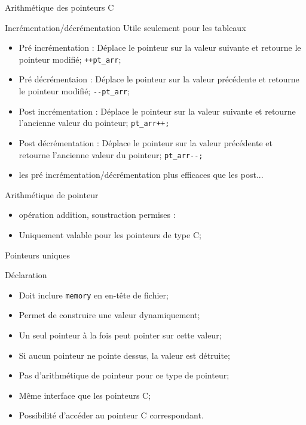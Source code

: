 \documentclass[handout,10pt]{beamer}
\newcommand{\includepartcode}[4][cpp]{

}
\begin{document}
\begin{frame}[fragile]{Arithmétique des pointeurs C}
\tiny
\begin{block}{Incrémentation/décrémentation}
Utile seulement pour les tableaux
\begin{itemize}
\item {\color{blue}Pré incrémentation} : Déplace le pointeur sur la valeur suivante et retourne le pointeur modifié; \lstinline$++pt_arr$;
\item {\color{blue}Pré décrémentaion} : Déplace le pointeur sur la valeur précédente et retourne le pointeur modifié; \lstinline$--pt_arr$;
\item {\color{blue}Post incrémentation} : Déplace le pointeur sur la valeur suivante et retourne l'ancienne valeur du pointeur; \lstinline$pt_arr++;$
\item {\color{blue}Post décrémentation} : Déplace le pointeur sur la valeur précédente et retourne l'ancienne valeur du pointeur; \lstinline$pt_arr--;$
\item les pré incrémentation/décrémentation plus efficaces que les post...
\end{itemize}
\end{block}

\begin{block}{Arithmétique de pointeur}
\begin{itemize}
\item opération addition, soustraction permises :
\includepartcode{pointeurs.cpp}{23}{25}
\item Uniquement valable pour les pointeurs de type C;
\end{itemize}
\end{block}
\end{frame}

\begin{frame}[fragile]{Pointeurs uniques}
\tiny
\begin{block}{Déclaration}
\begin{itemize}
\item Doit inclure \lstinline$memory$ en en-tête de fichier;
\item Permet de construire une valeur dynamiquement;
\item Un seul pointeur à la fois peut pointer sur cette valeur;
\item Si aucun pointeur ne pointe dessus, la valeur est détruite;
\item Pas d'arithmétique de pointeur pour ce type de pointeur;
\item Même interface que les pointeurs C;
\item Possibilité d'accéder au pointeur C correspondant.
\end{itemize}
\end{block}
\includepartcode{pointeurs.cpp}{29}{35}
\end{frame}
\end{document}
